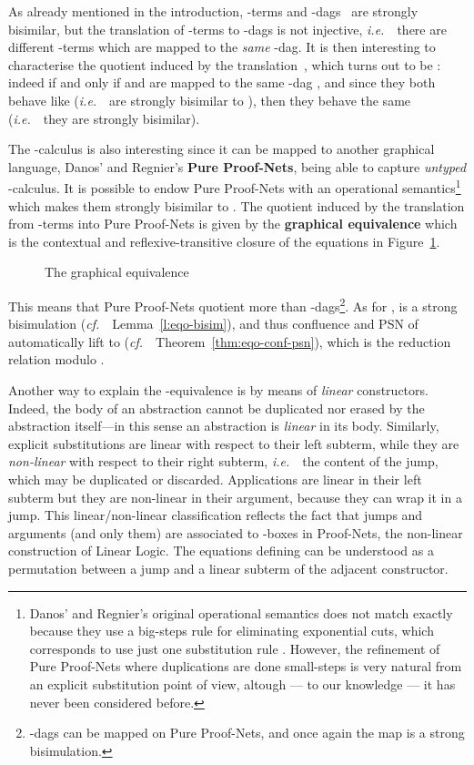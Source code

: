 \documentclass{LMCS}
\newcommand{\ie}{{\it  i.e.}~}
\newcommand{\cf}{{\it  cf.}~}
\renewcommand{\>}{\rightarrow}
\newcommand{\deft}[1]{{\bf #1}}
\begin{document}
As already mentioned in the introduction, 
 -terms and
-dags~\cite{AccattoliTh} are strongly bisimilar, 
but the translation of -terms to -dags is not
injective, \ie\ there are different -terms 
which are mapped to the \textit{same} -dag. 
It is then interesting to characterise  the quotient induced by the
translation~\cite{AccattoliTh}, which turns out to be : indeed  if and only if  and
 are mapped to the same -dag , and since they both behave
like  (\ie\  are strongly bisimilar to ), then  they behave the same
(\ie\  they are strongly bisimilar).\medskip

The -calculus is also 
interesting since it can be mapped
 to another graphical language, Danos' and Regnier's \deft{Pure
  Proof-Nets}, being able to capture
\textit{untyped} -calculus. It is possible to endow Pure Proof-Nets
with an operational semantics\footnote{Danos' and Regnier's original
  operational semantics does not match exactly  because they use
  a big-steps rule for eliminating exponential cuts, which corresponds
  to use just one substitution rule
  . However, the refinement of Pure
  Proof-Nets where duplications are done small-steps is very natural
  from an explicit substitution point of view, altough --- to our
  knowledge --- it has never been considered before.} which makes them
strongly bisimilar to . The quotient
induced by the translation  from -terms into Pure Proof-Nets is
given by the \deft{graphical equivalence}  
which is the contextual
and reflexive-transitive closure of the 
equations in Figure~\ref{f:eqo}. 


\begin{figure}[ht]

\caption{The graphical  equivalence } 
\label{f:eqo}
\end{figure}

This means that Pure Proof-Nets quotient more than
-dags\footnote{-dags can be mapped on Pure Proof-Nets, and
  once again the map is a strong bisimulation.}. As
for ,  is a strong bisimulation
(\cf\ Lemma~\ref{l:eqo-bisim}), and thus confluence and PSN
of  
automatically lift to 
(\cf\ Theorem~\ref{thm:eqo-conf-psn}), which is the reduction relation
 modulo .\medskip

Another way to explain the  -equivalence 
is by  means of \textit{linear} constructors. Indeed, 
the body of an abstraction cannot be duplicated nor erased by the
abstraction itself---in this sense an abstraction is \textit{linear}
in its body. Similarly, explicit substitutions are linear with
respect to their left subterm, while they are \textit{non-linear} with
respect to their right subterm, \ie\ the content of the jump, which may be
duplicated or discarded. Applications are linear in their left
subterm but they are non-linear in their argument, 
because they can wrap
it in a jump. This linear/non-linear classification reflects the fact
that jumps and arguments (and only them) are associated
to -boxes in Proof-Nets, the non-linear construction of Linear Logic.  The
equations defining  can be understood as a permutation between a jump 
and a linear subterm of the
adjacent constructor.
\end{document}
